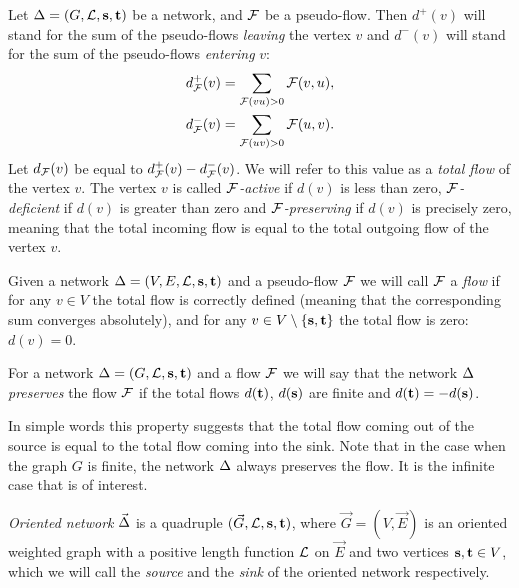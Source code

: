 \documentclass[12pt,oneside,a4paper]{amsart}
\begin{document}
      \begin{definition}
        Let $\Delta = (G, \mathcal{L}, \mathbf{s}, \mathbf{t})$ be a network, and $\mathcal{F}$ be a pseudo-flow.
        Then $d^{+}(v)$ will stand for the sum of the pseudo-flows \emph{leaving} the vertex $v$ and
        $d^{-}(v)$ will stand for the sum of the pseudo-flows \emph{entering} $v$:
        \begin{align*}
          &d^{+}_{\mathcal{F}}(v) = \sum_{\mathcal{F}(vu) > 0} \mathcal{F}(v,u),\\
          &d^{-}_{\mathcal{F}}(v) = \sum_{\mathcal{F}(uv) > 0} \mathcal{F}(u,v).
        \end{align*}
        Let $d_{\mathcal{F}}(v)$ be equal to $d^{+}_{\mathcal{F}}(v) - d^{-}_{\mathcal{F}}(v)$.
        We will refer to this value as a \emph{total flow} of the vertex $v$.
        The vertex $v$ is called \emph{$\mathcal{F}$-active} if $d(v)$ is less than zero,
          \emph{$\mathcal{F}$-deficient} if $d(v)$ is greater than zero and
          \emph{$\mathcal{F}$-preserving} if $d(v)$ is precisely zero, meaning that the total incoming flow
          is equal to the total outgoing flow of the vertex $v$.
      \end{definition}
      \begin{definition}
        \label{flow-dfn}
        Given a network $\Delta = (V, E, \mathcal{L}, \mathbf{s}, \mathbf{t})$ and a pseudo-flow $\mathcal{F}$ we will call $\mathcal{F}$ a
          \emph{flow} if for any $v \in V$ the total flow is correctly defined (meaning that the corresponding sum converges absolutely),
          and for any $v \in V \setminus \{\mathbf{s}, \mathbf{t}\}$ the total flow is zero: $d(v) = 0$.
      \end{definition}
      \begin{definition}
        \label{flow-preserving-dfn}
        For a network $\Delta = (G, \mathcal{L}, \mathbf{s}, \mathbf{t})$ and a flow $\mathcal{F}$ we will say
          that the network $\Delta$ \emph{preserves} the flow $\mathcal{F}$ if the total flows $d(\mathbf{t})$, $d(\mathbf{s})$ are finite
          and $d(\mathbf{t}) = -d(\mathbf{s})$.
      \end{definition}
      \begin{remark}
        In simple words this property suggests that the total flow coming out of the source is equal to the total flow
          coming into the sink.
        Note that in the case when the graph $G$ is finite, the network $\Delta$ always preserves the flow.
        It is the infinite case that is of interest.
      \end{remark}
      \begin{definition}
        \emph{Oriented network} $\vec{\Delta}$ is a quadruple $(\vec{G}, \mathcal{L}, \mathbf{s}, \mathbf{t})$, where
          $\vec{G} = (V, \vec{E})$ is an oriented weighted graph with
          a positive length function $\mathcal{L}$ on $\vec{E}$ and two vertices $\mathbf{s}, \mathbf{t} \in V$, which
          we will call the \emph{source} and the \emph{sink} of the oriented network respectively.
      \end{definition}
\end{document}
